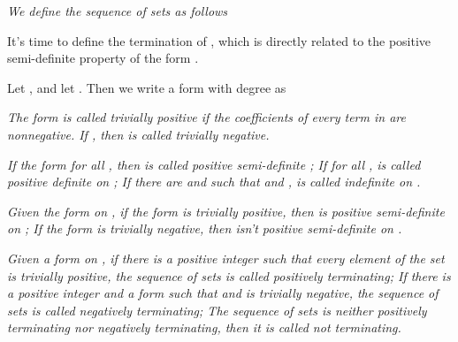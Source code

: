 \documentclass [10pt,a4paper]{article}
\begin{document}





\begin{definition}
\emph{  We def\mbox{}ine the sequence of sets
 as follows}

 \end{definition}

It's time to def\mbox{}ine the termination of
, which is directly related
to the positive semi-definite property of the form .

Let ,
and let . Then we write
a form  with degree  as 

 \begin{definition}
\emph{ The form  is called trivially positive if the
coef\mbox{}f\mbox{}icients  of every term
 in   are
nonnegative.  If , then  is called  trivially
negative.}
\end{definition}

\begin{definition}
   \emph{ If the form
     for all ,  then  is called positive semi-def\mbox{}inite ; If
     for all ,
    is called positive def\mbox{}inite on
   ; If there are  and 
such that  and  ,
    is called indef\mbox{}inite on
   . }
\end{definition}

  \begin{lemma}  \label{zpft}
\emph{Given the form  on   , if the form  is
trivially positive, then   is positive semi-def\mbox{}inite on
   ; If the
form  is trivially negative, then   isn't positive
semi-def\mbox{}inite on
   . }
\end{lemma}


\begin{definition}\label{deft}
\emph{Given a form  on   , if there is a positive
integer  such that every element of the set
 is trivially positive, the sequence of sets
 is called positively
terminating;  If there is a positive integer  and a form  such
that  and  is trivially negative, the
sequence of sets  is called
negatively terminating;   The sequence of sets
 is neither positively
terminating nor negatively terminating, then it is called not
terminating.}
 \end{definition}
\end{document}
